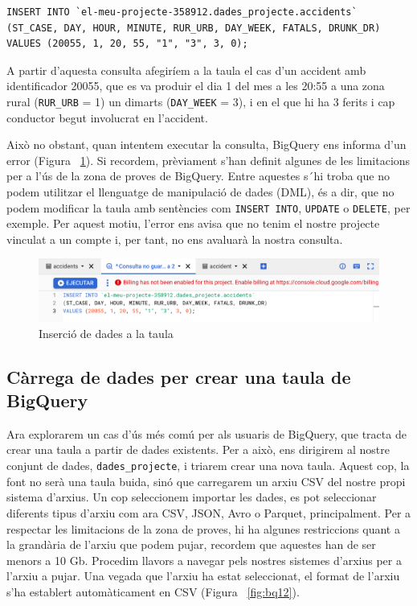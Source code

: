 \documentclass[12pt,longbibliography]{article}
\theoremstyle{definition}
\theoremstyle{remark}
\begin{document}
\begin{verbatim}
INSERT INTO `el-meu-projecte-358912.dades_projecte.accidents` 
(ST_CASE, DAY, HOUR, MINUTE, RUR_URB, DAY_WEEK, FATALS, DRUNK_DR)
VALUES (20055, 1, 20, 55, "1", "3", 3, 0);
\end{verbatim}

A partir d'aquesta consulta afegiríem a la taula el cas d'un accident amb identificador 20055, que es va produir el dia 1 del mes a les 20:55 a una zona rural (\verb|RUR_URB| = 1) un dimarts (\verb|DAY_WEEK| = 3), i en el que hi ha 3 ferits i cap conductor begut involucrat en l'accident.

Això no obstant, quan intentem executar la consulta, BigQuery ens informa d'un error (Figura ~\ref{fig:bq11}). Si recordem, prèviament s'han definit algunes de les limitacions per a l'ús de la zona de proves de BigQuery. Entre aquestes s´hi troba que no podem utilitzar el llenguatge de manipulació de dades (DML), és a dir, que no podem modificar la taula amb sentències com \verb|INSERT INTO|, \verb|UPDATE| o \verb|DELETE|, per exemple. Per aquest motiu, l'error ens avisa que no tenim el nostre projecte vinculat a un compte i, per tant, no ens avaluarà la nostra consulta.


\begin{figure}[h!]
\begin{center}
\includegraphics[width=12cm]{bq11}
\end{center}
\caption{Inserció de dades a la taula}
\label{fig:bq11}
\end{figure}


\newpage

\subsection{Càrrega de dades per crear una taula de BigQuery}

Ara explorarem un cas d'ús més comú per als usuaris de BigQuery, que tracta de crear una taula a partir de dades existents. Per a això, ens dirigirem al nostre conjunt de dades, \verb|dades_projecte|, i triarem crear una nova taula. Aquest cop, la font no serà una taula buida, sinó que carregarem un arxiu CSV del nostre propi sistema d'arxius. Un cop seleccionem importar les dades, es pot seleccionar diferents tipus d'arxiu com ara CSV, JSON, Avro o Parquet, principalment. Per a respectar les limitacions de la zona de proves, hi ha algunes restriccions quant a la grandària de l'arxiu que podem pujar, recordem que aquestes han de ser menors a 10 Gb. Procedim llavors a navegar pels nostres sistemes d'arxius per a l'arxiu a pujar. Una vegada que l'arxiu ha estat seleccionat, el format de l'arxiu s'ha establert automàticament en CSV (Figura ~\ref{fig:bq12}). 
\end{document}
